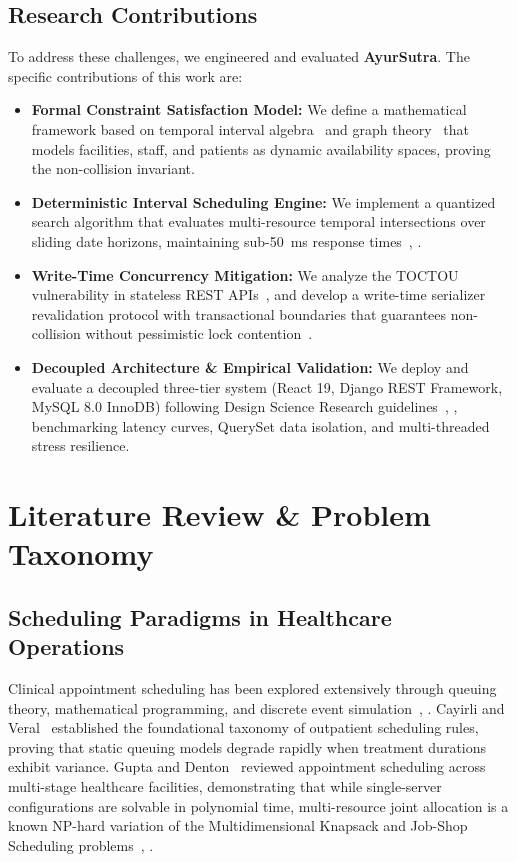 \documentclass[conference]{IEEEtran}
\begin{document}
\subsection{Research Contributions}
To address these challenges, we engineered and evaluated \textbf{AyurSutra}. The specific contributions of this work are:
\begin{itemize}
    \item \textbf{Formal Constraint Satisfaction Model:} We define a mathematical framework based on temporal interval algebra~\cite{allen1983maintaining} and graph theory~\cite{golumbic2004algorithmic} that models facilities, staff, and patients as dynamic availability spaces, proving the non-collision invariant.
    \item \textbf{Deterministic Interval Scheduling Engine:} We implement a quantized search algorithm that evaluates multi-resource temporal intersections over sliding date horizons, maintaining sub-50~ms response times~\cite{cayirli2003outpatient}, \cite{vanessen2014breaking}.
    \item \textbf{Write-Time Concurrency Mitigation:} We analyze the TOCTOU vulnerability in stateless REST APIs~\cite{fielding2000architectural}, \cite{panda2022concurrency} and develop a write-time serializer revalidation protocol with transactional boundaries that guarantees non-collision without pessimistic lock contention~\cite{bishop1996checking}.
    \item \textbf{Decoupled Architecture \& Empirical Validation:} We deploy and evaluate a decoupled three-tier system (React 19, Django REST Framework, MySQL 8.0 InnoDB) following Design Science Research guidelines~\cite{peffers2007design}, \cite{hevner2004design}, benchmarking latency curves, QuerySet data isolation, and multi-threaded stress resilience.
\end{itemize}

\section{Literature Review \& Problem Taxonomy}

\subsection{Scheduling Paradigms in Healthcare Operations}
Clinical appointment scheduling has been explored extensively through queuing theory, mathematical programming, and discrete event simulation~\cite{cayirli2003outpatient}, \cite{gupta2008appointment}. Cayirli and Veral~\cite{cayirli2003outpatient} established the foundational taxonomy of outpatient scheduling rules, proving that static queuing models degrade rapidly when treatment durations exhibit variance. Gupta and Denton~\cite{gupta2008appointment} reviewed appointment scheduling across multi-stage healthcare facilities, demonstrating that while single-server configurations are solvable in polynomial time, multi-resource joint allocation is a known NP-hard variation of the Multidimensional Knapsack and Job-Shop Scheduling problems~\cite{vanessen2014breaking}, \cite{schimmelpfeng2021operating}.
\end{document}
